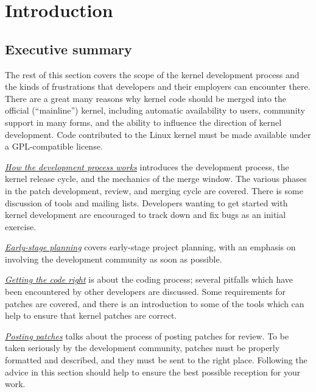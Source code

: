\documentclass[a4paper,8pt,english]{sphinxmanual}
\begin{document}
\section{Introduction}
\label{process/1.Intro:introduction}\label{process/1.Intro::doc}

\subsection{Executive summary}
\label{process/1.Intro:executive-summary}
The rest of this section covers the scope of the kernel development process
and the kinds of frustrations that developers and their employers can
encounter there.  There are a great many reasons why kernel code should be
merged into the official (``mainline'') kernel, including automatic
availability to users, community support in many forms, and the ability to
influence the direction of kernel development.  Code contributed to the
Linux kernel must be made available under a GPL-compatible license.

{\hyperref[process/2.Process:development\string-process]{\emph{How the development process works}}} introduces the development process, the kernel
release cycle, and the mechanics of the merge window.  The various phases in
the patch development, review, and merging cycle are covered.  There is some
discussion of tools and mailing lists.  Developers wanting to get started
with kernel development are encouraged to track down and fix bugs as an
initial exercise.

{\hyperref[process/3.Early\string-stage:development\string-early\string-stage]{\emph{Early-stage planning}}} covers early-stage project planning, with an
emphasis on involving the development community as soon as possible.

{\hyperref[process/4.Coding:development\string-coding]{\emph{Getting the code right}}} is about the coding process; several pitfalls which
have been encountered by other developers are discussed.  Some requirements for
patches are covered, and there is an introduction to some of the tools
which can help to ensure that kernel patches are correct.

{\hyperref[process/5.Posting:development\string-posting]{\emph{Posting patches}}} talks about the process of posting patches for
review. To be taken seriously by the development community, patches must be
properly formatted and described, and they must be sent to the right place.
Following the advice in this section should help to ensure the best
possible reception for your work.
\end{document}

